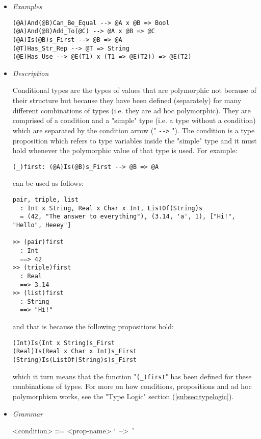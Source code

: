 \documentclass[diploma]{softlab-thesis}
\begin{document}
\begin{itemize}
\item \textit{Examples}
\begin{verbatim}
(@A)And(@B)Can_Be_Equal --> @A x @B => Bool
(@A)And(@B)Add_To(@C) --> @A x @B => @C
(@A)Is(@B)s_First --> @B => @A
(@T)Has_Str_Rep --> @T => String
(@E)Has_Use --> @E(T1) x (T1 => @E(T2)) => @E(T2)
\end{verbatim}

\item \textit{Description}

Conditional types are the types of values that are polymorphic not because of
their structure but because they have been defined (separately) for many
different combinations of types (i.e. they are ad hoc polymorphic). They are
comprised of a condition and a "simple" type (i.e. a type without a condition)
which are separated by the condition arrow (" \verb|-->| "). The condition is
a type proposition which refers to type variables inside the "simple" type and
it must hold whenever the polymorphic value of that type is used. For example:
\begin{verbatim}
(_)first: (@A)Is(@B)s_First --> @B => @A
\end{verbatim}
can be used as follows:
\begin{verbatim}
pair, triple, list
  : Int x String, Real x Char x Int, ListOf(String)s
  = (42, "The answer to everything"), (3.14, 'a', 1), ["Hi!", "Hello", Heeey"]

>> (pair)first
  : Int
  ==> 42
>> (triple)first
  : Real
  ==> 3.14
>> (list)first
  : String
  ==> "Hi!"
\end{verbatim}
and that is because the following propositions hold:
\begin{verbatim}
(Int)Is(Int x String)s_First
(Real)Is(Real x Char x Int)s_First
(String)Is(ListOf(String)s)s_First
\end{verbatim}
which it turn means that the function "\verb|(_)first|" has been defined for these
combinations of types. For more on how conditions, propositions and ad hoc
polymorphism works, see the "Type Logic" section (\ref{subsec:typelogic}).

\item \textit{Grammar}
\begin{grammar}
<condition> ::= <prop-name> `\ -->\ '
\end{grammar}

\end{itemize}

\newpage
\end{document}
